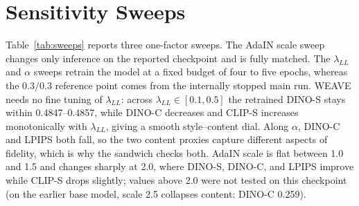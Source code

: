 \documentclass[conference]{IEEEtran}
\newcommand{\dinos}{DINO-S}
\newcommand{\dinoc}{DINO-C}
\newcommand{\clips}{CLIP-S}
\begin{document}
\section{Sensitivity Sweeps}
\label{sec:sweeps}

Table~\ref{tab:sweeps} reports three one-factor sweeps. The AdaIN scale sweep changes only
inference on the reported checkpoint and is fully matched. The $\lambda_{LL}$ and $\alpha$ sweeps
retrain the model at a fixed budget of four to five epochs, whereas the $0.3/0.3$ reference point comes from the
internally stopped main run. WEAVE needs no fine tuning of $\lambda_{LL}$: across
$\lambda_{LL}\in[0.1,0.5]$ the retrained \dinos{} stays within 0.4847--0.4857, while \dinoc{} decreases
and \clips{} increases monotonically with $\lambda_{LL}$, giving a smooth style--content dial. Along $\alpha$, \dinoc{} and LPIPS both fall, so the two content
proxies capture different aspects of fidelity, which is why the sandwich checks both. AdaIN scale is flat between
1.0 and 1.5 and changes sharply at 2.0, where \dinos{}, \dinoc{}, and LPIPS improve while \clips{}
drops slightly; values above 2.0 were not tested on this checkpoint (on the earlier base model,
scale 2.5 collapses content: \dinoc{} 0.259).
\end{document}
